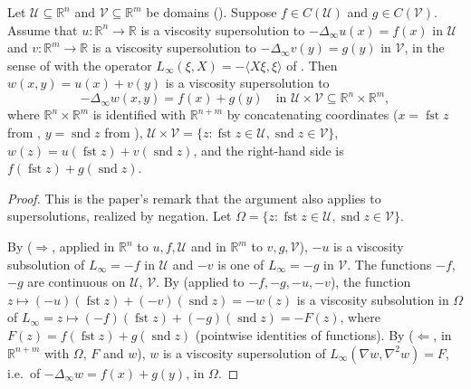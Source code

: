 \begin{theorem}
Let $\mathcal U\subseteq\mathbb R^n$ and $\mathcal V\subseteq\mathbb R^m$ be domains (). Suppose $f\in C(\mathcal U)$ and $g\in C(\mathcal V)$. Assume that $u:\mathbb R^n\to\mathbb R$ is a viscosity supersolution to $-\Delta_\infty u(x)=f(x)$ in $\mathcal U$ and $v:\mathbb R^m\to\mathbb R$ is a viscosity supersolution to $-\Delta_\infty v(y)=g(y)$ in $\mathcal V$, in the sense of  with the operator $L_\infty(\xi,X)=-\langle X\xi,\xi\rangle$ of . Then $w(x,y)=u(x)+v(y)$ is a viscosity supersolution to
\[
-\Delta_\infty w(x,y)=f(x)+g(y)\quad\text{in }\mathcal U\times\mathcal V\subseteq\mathbb R^n\times\mathbb R^m ,
\]
where $\mathbb R^n\times\mathbb R^m$ is identified with $\mathbb R^{n+m}$ by concatenating coordinates ($x=\operatorname{fst}z$ from , $y=\operatorname{snd}z$ from ), $\mathcal U\times\mathcal V=\{z:\operatorname{fst}z\in\mathcal U,\operatorname{snd}z\in\mathcal V\}$, $w(z)=u(\operatorname{fst}z)+v(\operatorname{snd}z)$, and the right-hand side is $f(\operatorname{fst}z)+g(\operatorname{snd}z)$.
\end{theorem}
\begin{proof}
This is the paper's remark that the argument also applies to supersolutions, realized by negation. Let $\Omega=\{z:\operatorname{fst}z\in\mathcal U,\operatorname{snd}z\in\mathcal V\}$.

By  ($\Rightarrow$, applied in $\mathbb R^n$ to $u,f,\mathcal U$ and in $\mathbb R^m$ to $v,g,\mathcal V$), $-u$ is a viscosity subsolution of $L_\infty=-f$ in $\mathcal U$ and $-v$ is one of $L_\infty=-g$ in $\mathcal V$. The functions $-f$, $-g$ are continuous on $\mathcal U$, $\mathcal V$. By  (applied to $-f,-g,-u,-v$), the function $z\mapsto(-u)(\operatorname{fst}z)+(-v)(\operatorname{snd}z)=-w(z)$ is a viscosity subsolution in $\Omega$ of $L_\infty=z\mapsto(-f)(\operatorname{fst}z)+(-g)(\operatorname{snd}z)=-F(z)$, where $F(z)=f(\operatorname{fst}z)+g(\operatorname{snd}z)$ (pointwise identities of functions). By  ($\Leftarrow$, in $\mathbb R^{n+m}$ with $\Omega$, $F$ and $w$), $w$ is a viscosity supersolution of $L_\infty(\nabla w,\nabla^2w)=F$, i.e.\ of $-\Delta_\infty w=f(x)+g(y)$, in $\Omega$.
\end{proof}
